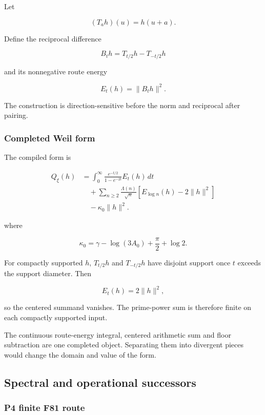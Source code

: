 Let

\[
(T_ah)(u)=h(u+a).
\]

Define the reciprocal difference

\[
B_th=T_{t/2}h-T_{-t/2}h
\]

and its nonnegative route energy

\[
E_t(h)=\|B_th\|^2.
\]

The construction is direction-sensitive before the norm and reciprocal
after pairing.

\subsubsection{Completed Weil form}\label{viii-ch09-completed-weil-form}

The compiled form is

\[
\begin{aligned}
Q_\xi(h)&=\int_0^\infty
\frac{e^{-t/2}}{1-e^{-2t}}E_t(h)\,dt\\
&\quad+\sum_{n\ge2}\frac{\Lambda(n)}{\sqrt n}
\left[E_{\log n}(h)-2\|h\|^2\right]\\
&\quad-\kappa_0\|h\|^2.
\end{aligned}
\]

where

\[
\kappa_0
=\gamma-\log(3A_0)+\frac\pi2+\log2.
\]

For compactly supported \(h\), \(T_{t/2}h\) and \(T_{-t/2}h\) have
disjoint support once \(t\) exceeds the support diameter. Then

\[
E_t(h)=2\|h\|^2,
\]

so the centered summand vanishes. The prime-power sum is therefore
finite on each compactly supported input.

The continuous route-energy integral, centered arithmetic sum and floor
subtraction are one completed object. Separating them into divergent
pieces would change the domain and value of the form.

\subsection{Spectral and operational
successors}\label{viii-ch09-spectral-and-operational-successors}

\subsubsection{P4 finite F81 route}\label{viii-ch09-p4-finite-f81-route}

